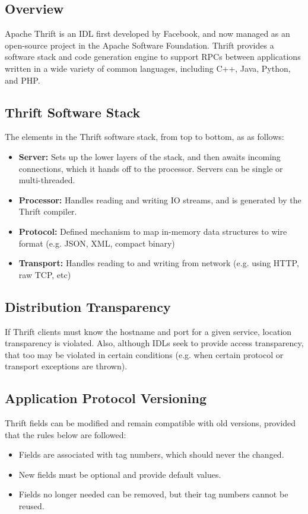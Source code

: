 \documentclass[12pt,titlepage]{article}
\begin{document}
    \subsection{Overview}
      Apache Thrift is an IDL first developed by Facebook, and now managed as an open-source project in the Apache Software Foundation. Thrift provides
      a software stack and code generation engine to support RPCs between applications written in a wide variety of common languages, including C++, Java,
      Python, and PHP.

    \subsection{Thrift Software Stack}
      The elements in the Thrift software stack, from top to bottom, as as follows:
      \begin{itemize}
        \item \textbf{Server:} Sets up the lower layers of the stack, and then awaits incoming connections, which it hands off to the processor. Servers
        can be single or multi-threaded.
        \item \textbf{Processor:} Handles reading and writing IO streams, and is generated by the Thrift compiler.
        \item \textbf{Protocol:} Defined mechanism to map in-memory data structures to wire format (e.g. JSON, XML, compact binary)
        \item \textbf{Transport:} Handles reading to and writing from network (e.g. using HTTP, raw TCP, etc)
      \end{itemize}

    \subsection{Distribution Transparency}
      If Thrift clients must know the hostname and port for a given service, location transparency is violated. Also, although IDLs seek to provide access
      transparency, that too may be violated in certain conditions (e.g. when certain protocol or transport exceptions are thrown).

    \subsection{Application Protocol Versioning}
      Thrift fields can be modified and remain compatible with old versions, provided that the rules below are followed:
      \begin{itemize}
        \item Fields are associated with tag numbers, which should never the changed.
        \item New fields must be optional and provide default values.
        \item Fields no longer needed can be removed, but their tag numbers cannot be reused.
      \end{itemize}
\end{document}
